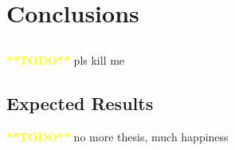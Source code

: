 \chapter{Conclusions} \label{chap:concl}

\section*{}

\textcolor{yellow}{\textbf{**TODO**}}
pls kill me

\section{Expected Results}

\textcolor{yellow}{\textbf{**TODO**}} no more thesis, much happiness




